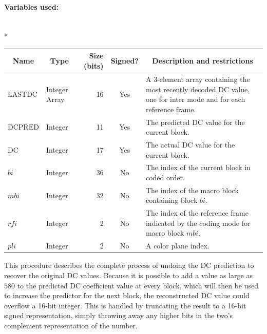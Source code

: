 \documentclass[9pt,letterpaper]{book}
\newcommand{\idx}[1]{{\ensuremath{\mathit{#1}}}}
\newcommand{\pli}{\idx{pli}}
\newcommand{\bi}{\idx{bi}}
\newcommand{\mbi}{\idx{mbi}}
\newcommand{\rfi}{\idx{rfi}}
\newcommand{\locvar}[1]{\ensuremath{\mathrm{#1}}}
\numberwithin{equation}{chapter}
\numberwithin{figure}{chapter}
\numberwithin{table}{chapter}
\begin{document}
\paragraph{Variables used:}\hfill\\*
\begin{tabularx}{\textwidth}{@{}llrcX@{}}\toprule
\multicolumn{1}{c}{Name} &
\multicolumn{1}{c}{Type} &
\multicolumn{1}{p{30pt}}{\centering Size (bits)} &
\multicolumn{1}{c}{Signed?} &
\multicolumn{1}{c}{Description and restrictions} \\\midrule\endhead
\locvar{LASTDC}   & \multicolumn{1}{p{40pt}}{Integer Array} &
                              16 & Yes & A 3-element array containing the
 most recently decoded DC value, one for inter mode and for each reference
 frame. \\
\locvar{DCPRED}   & Integer & 11 & Yes & The predicted DC value for the current
 block. \\
\locvar{DC}       & Integer & 17 & Yes & The actual DC value for the current
 block. \\
\locvar{\bi}      & Integer & 36 & No  & The index of the current block in
 coded order. \\
\locvar{\mbi}     & Integer & 32 & No  & The index of the macro block
 containing block \locvar{\bi}. \\
\locvar{\rfi}     & Integer &  2 & No  & The index of the reference frame
 indicated by the coding mode for macro block \locvar{\mbi}. \\
\locvar{\pli}     & Integer &  2 & No  & A color plane index. \\
\bottomrule\end{tabularx}
\medskip

This procedure describes the complete process of undoing the DC prediction to
 recover the original DC values.
Because it is possible to add a value as large as $580$ to the predicted DC
 coefficient value at every block, which will then be used to increase the
 predictor for the next block, the reconstructed DC value could overflow a
 16-bit integer.
This is handled by truncating the result to a 16-bit signed representation,
 simply throwing away any higher bits in the two's complement representation of
 the number.
\end{document}
